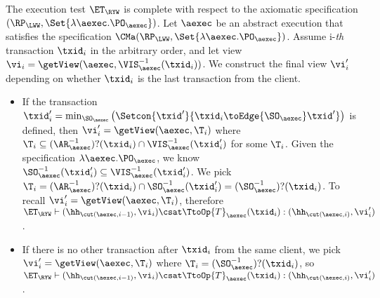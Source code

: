The execution test $\ET_{\RYW}$ is complete with respect to 
the axiomatic specification $(\RP_{\LWW}, \Set{\lambda \aexec.\PO_{\aexec} })$. 
Let $\aexec$ be an abstract execution that satisfies the specification
$\CMa(\RP_{\LWW}, \Set{\lambda \aexec.\PO_{\aexec} })$.
Assume i-\emph{th} transaction \( \txid_i \) in the arbitrary order,
and let view \( \vi_{i} = \getView(\aexec, \VIS^{-1}_{\aexec}(\txid_{i}) ) \).
We construct the final view \( \vi'_i\) depending on whether \( \txid_i \) is the last transaction from the client.
\begin{itemize}
\item If the transaction \( \txid'_i = \min_{\SO_\aexec}\left(\Setcon{\txid'}{\txid_i \toEdge{\SO_\aexec} \txid' } \right) \)  is defined,
then \( \vi'_i = \getView(\aexec, \T_i) \) where \( \T_i \subseteq (\AR_{\aexec}^{-1})?(\txid_i) \cap \VIS_\aexec^{-1}(\txid'_i) \) for some \( \T_i \).
Given the specification \( \lambda \aexec.\PO_{\aexec} \), 
we know \( \SO_\aexec^{-1}(\txid'_i) \subseteq \VIS_\aexec^{-1}(\txid'_i) \).
We pick \( \T_i = (\AR_\aexec^{-1})?(\txid_i) \cap \SO_\aexec^{-1}(\txid'_i) = (\SO_\aexec^{-1})?(\txid_i) \).
To recall \( \vi'_i = \getView(\aexec, \T_i) \), therefore \( \ET_\RYW \vdash (\hh_{\cut(\aexec, i-1)}, \vi_i) \csat \TtoOp{T}_{\aexec}(\txid_{i}) : (\hh_{\cut(\aexec, i)}, \vi'_{i}) \).
\item If there is no other transaction after \( \txid_i \) from the same client,
we pick \( \vi'_i = \getView(\aexec, \T_i) \) where \( \T_i = (\SO_\aexec^{-1})?(\txid_i) \),
so \( \ET_\RYW \vdash (\hh_{\cut(\aexec, i-1)}, \vi_i) \csat \TtoOp{T}_{\aexec}(\txid_{i}) : (\hh_{\cut(\aexec, i)}, \vi'_{i}) \).
\end{itemize}
